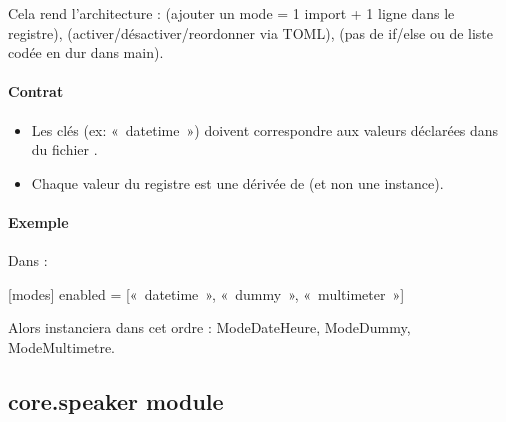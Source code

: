 \documentclass[letterpaper,10pt,french]{sphinxmanual}
\begin{document}
\sphinxAtStartPar
Cela rend l’architecture :
\sphinxhyphen{}  (ajouter un mode = 1 import + 1 ligne dans le registre),
\sphinxhyphen{}  (activer/désactiver/re\sphinxhyphen{}ordonner via TOML),
\sphinxhyphen{}  (pas de if/else ou de liste codée en dur dans main).


\paragraph{Contrat}
\label{\detokenize{api/core:contrat}}\begin{itemize}
\item {} 
\sphinxAtStartPar
Les clés (ex: « datetime ») doivent correspondre aux valeurs déclarées
dans  du fichier .

\item {} 
\sphinxAtStartPar
Chaque valeur du registre est une  dérivée de 
(et non une instance).

\end{itemize}


\paragraph{Exemple}
\label{\detokenize{api/core:exemple}}
\sphinxAtStartPar
Dans  :

\sphinxAtStartPar
{[}modes{]}
enabled = {[}« datetime », « dummy », « multimeter »{]}

\sphinxAtStartPar
Alors  instanciera dans cet ordre :
ModeDateHeure, ModeDummy, ModeMultimetre.


\subsection{core.speaker module}
\label{\detokenize{api/core:module-core.speaker}}\label{\detokenize{api/core:core-speaker-module}}
\end{document}
